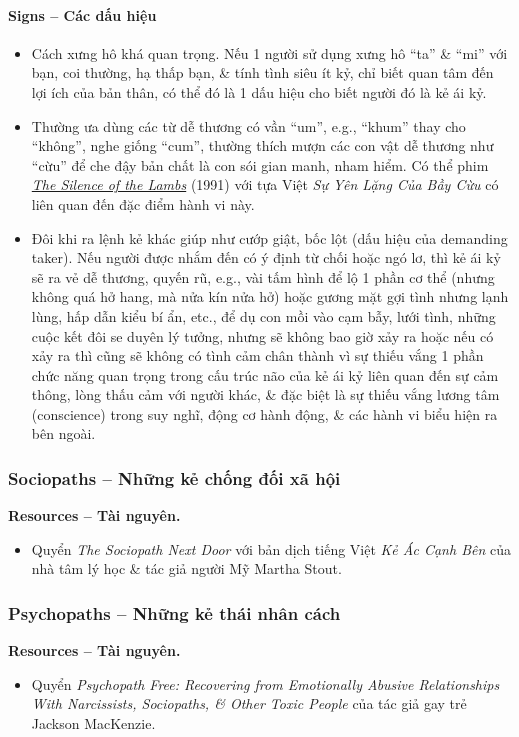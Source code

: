 \documentclass[12pt]{article}
\begin{document}
\paragraph{Signs -- Các dấu hiệu}
\begin{itemize}
	\item Cách xưng hô khá quan trọng. Nếu 1 người sử dụng xưng hô ``ta'' \& ``mi'' với bạn, coi thường, hạ thấp bạn, \& tính tình siêu ít kỷ, chỉ biết quan tâm đến lợi ích của bản thân, có thể đó là 1 dấu hiệu cho biết người đó là kẻ ái kỷ.
	\item Thường ưa dùng các từ dễ thương có vần ``um'', e.g., ``khum'' thay cho ``không'', nghe giống ``cum'', thường thích mượn các con vật dễ thương như ``cừu'' để che đậy bản chất là con sói gian manh, nham hiểm. Có thể phim \href{https://www.imdb.com/title/tt0102926}{\it The Silence of the Lambs} (1991) với tựa Việt {\it Sự Yên Lặng Của Bầy Cừu} có liên quan đến đặc điểm hành vi này.
	\item Đôi khi ra lệnh kẻ khác giúp như cướp giật, bốc lột (dấu hiệu của demanding taker). Nếu người được nhắm đến có ý định từ chối hoặc ngó lơ, thì kẻ ái kỷ sẽ ra vẻ dễ thương, quyến rũ, e.g., vài tấm hình để lộ 1 phần cơ thể (nhưng không quá hở hang, mà nửa kín nửa hở) hoặc gương mặt gợi tình nhưng lạnh lùng, hấp dẫn kiểu bí ẩn, etc., để dụ con mồi vào cạm bẫy, lưới tình, những cuộc kết đôi se duyên lý tưởng, nhưng sẽ không bao giờ xảy ra hoặc nếu có xảy ra thì cũng sẽ không có tình cảm chân thành vì sự thiếu vắng 1 phần chức năng quan trọng trong cấu trúc não của kẻ ái kỷ liên quan đến sự cảm thông, lòng thấu cảm với người khác, \& đặc biệt là sự thiếu vắng lương tâm (conscience) trong suy nghĩ, động cơ hành động, \& các hành vi biểu hiện ra bên ngoài.
\end{itemize}

\subsubsection{Sociopaths -- Những kẻ chống đối xã hội}
\textbf{\textsf{Resources -- Tài nguyên.}}
\begin{itemize}
	\item Quyển {\it The Sociopath Next Door} \cite{Stout2006} với bản dịch tiếng Việt {\it Kẻ Ác Cạnh Bên} \cite{Stout2019} của nhà tâm lý học \& tác giả người Mỹ {\sc Martha Stout}.
\end{itemize}

\subsubsection{Psychopaths -- Những kẻ thái nhân cách}
\textbf{\textsf{Resources -- Tài nguyên.}}
\begin{itemize}
	\item Quyển {\it Psychopath Free: Recovering from Emotionally Abusive Relationships With Narcissists, Sociopaths, \& Other Toxic People} \cite{MacKenzie2015} của tác giả gay trẻ {\sc Jackson MacKenzie}.
\end{itemize}
\end{document}
